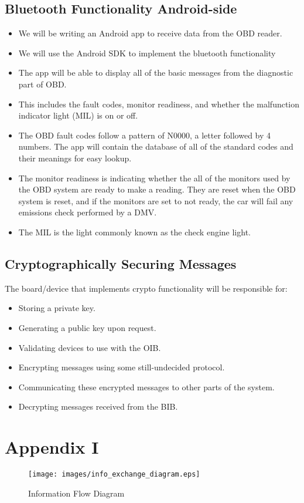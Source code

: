 \documentclass[12pt,letterpaper]{article}
\begin{document}
\subsection{Bluetooth Functionality Android-side}
\begin{itemize}
	\item We will be writing an Android app to receive data from the OBD reader.
	\item We will use the Android SDK to implement the bluetooth functionality
	\item The app will be able to display all of the basic messages from the diagnostic part of OBD.
	\item This includes the fault codes, monitor readiness, and whether the malfunction indicator light (MIL) is on or off.
	\item The OBD fault codes follow a pattern of N0000, a letter followed by 4 numbers. The app will contain the database of all of the standard codes and their meanings for easy lookup. 
	\item  The monitor readiness is indicating whether the all of the monitors used by the OBD system are ready to make a reading. They are reset when the OBD system is reset, and if the monitors are set to not ready, the car will fail any emissions check performed by a DMV. 
	\item The MIL is the light commonly known as the check engine light. 
\end{itemize}

\subsection{Cryptographically Securing Messages}
The board/device that implements crypto functionality will be responsible for:

\begin{itemize}
	\item Storing a private key.
	\item Generating a public key upon request.
	\item Validating devices to use with the OIB.
	\item Encrypting messages using some still-undecided protocol.
	\item Communicating these encrypted messages to other parts of the system.
	\item Decrypting messages received from the BIB.
\end{itemize}

\newpage

\section{Appendix I}
\begin{figure}[!ht]
\centering
\texttt{[image: images/info\_exchange\_diagram.eps]}
\caption{Information Flow Diagram}
\label{fig: image}
\end{figure}
\end{document}
